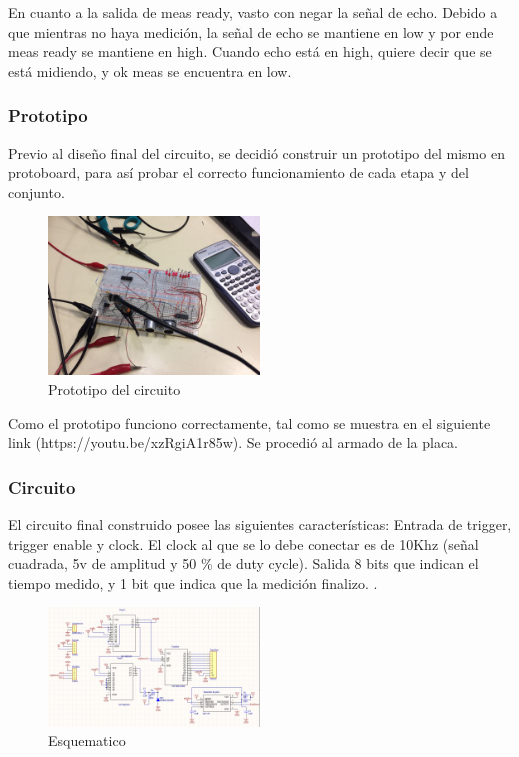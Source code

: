 \documentclass[../../e3_tp2_main.tex]{subfiles}
\begin{document}
En cuanto a la salida de meas ready, vasto con negar la señal de echo. Debido a que mientras no haya medición, la señal de echo se mantiene en low y por ende meas ready se mantiene en high. Cuando echo está en high, quiere decir que se está midiendo, y ok meas se encuentra en low.
\subsubsection{Prototipo}
Previo al diseño final del circuito, se decidió construir un prototipo del mismo en protoboard, para así probar el correcto funcionamiento de cada etapa y del conjunto. 
\begin{figure}[H]	
	\centering
	\includegraphics[angle=180,width=0.5\textwidth]{imagenes/prototipo.jpeg}
	\caption{Prototipo del circuito}
\end{figure}
Como el prototipo funciono correctamente, tal como se muestra en el siguiente link (https://youtu.be/xzRgiA1r85w). Se procedió al armado de la placa.
\subsubsection{Circuito}

El circuito final construido posee las siguientes características:
Entrada de trigger, trigger enable y clock. El clock al que se lo debe conectar es de 10Khz (señal cuadrada, 5v de amplitud y 50 \% de duty cycle).
Salida 8 bits que indican el tiempo medido, y 1 bit que indica que la medición finalizo.
.
\begin{figure}[H]	
	\centering
	\includegraphics[width=0.5\textwidth]{imagenes/esquematico.png}
	\caption{Esquematico}
\end{figure}
\end{document}
